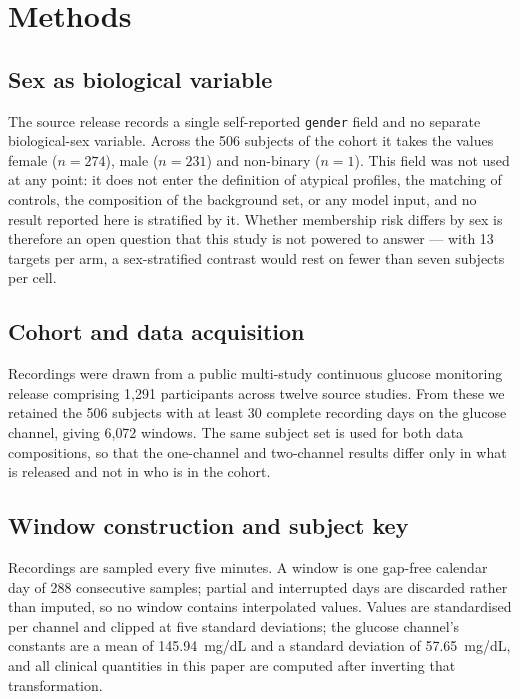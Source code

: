 \documentclass[pdflatex,sn-nature]{sn-jnl}
\theoremstyle{thmstyleone}
\begin{document}
\section{Methods}\label{sec:methods}

\subsection{Sex as biological variable}\label{subsec:sex}
The source release records a single self-reported \texttt{gender} field and no
separate biological-sex variable. Across the 506 subjects of the cohort it takes
the values female ($n=274$), male ($n=231$) and non-binary ($n=1$). This field
was not used at any point: it does not enter the definition of atypical
profiles, the matching of controls, the composition of the background set, or
any model input, and no result reported here is stratified by it. Whether
membership risk differs by sex is therefore an open question that this study is
not powered to answer --- with 13 targets per arm, a sex-stratified contrast
would rest on fewer than seven subjects per cell.

\subsection{Cohort and data acquisition}\label{subsec:cohort}
Recordings were drawn from a public multi-study continuous glucose monitoring
release comprising 1{,}291 participants across twelve source studies. From these
we retained the 506 subjects with at least 30 complete recording days on the
glucose channel, giving 6{,}072 windows. The same subject set is used for both
data compositions, so that the one-channel and two-channel results differ only
in what is released and not in who is in the cohort.

\subsection{Window construction and subject key}\label{subsec:windows}
Recordings are sampled every five minutes. A window is one gap-free calendar day
of 288 consecutive samples; partial and interrupted days are discarded rather
than imputed, so no window contains interpolated values. Values are standardised
per channel and clipped at five standard deviations; the glucose channel's
constants are a mean of \mbox{145.94 mg/dL} and a standard deviation of
\mbox{57.65 mg/dL}, and all clinical quantities in this paper are computed after
inverting that transformation.
\end{document}
